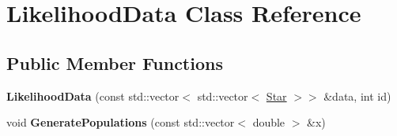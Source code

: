 \hypertarget{classLikelihoodData}{}\section{Likelihood\+Data Class Reference}
\label{classLikelihoodData}
\subsection*{Public Member Functions}
\begin{DoxyCompactItemize}
\item 
\mbox{\label{classLikelihoodData_abe754db1273e8ed99a0bf08a26c13aad}} 
{\bfseries Likelihood\+Data} (const std\+::vector$<$ std\+::vector$<$ \hyperlink{classStar}{Star} $>$$>$ \&data, int id)
\item 
\mbox{\label{classLikelihoodData_a1911a871964da019810ac0342352ae8c}} 
void {\bfseries Generate\+Populations} (const std\+::vector$<$ double $>$ \&x)
\end{DoxyCompactItemize}
